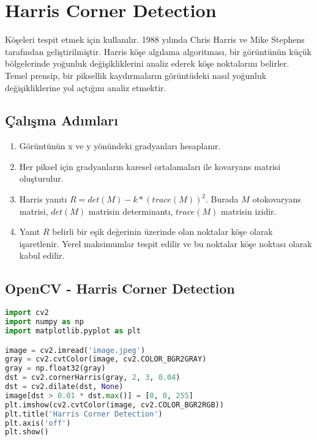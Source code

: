 \section{Harris Corner Detection}

Köşeleri tespit etmek için kullanılır. 1988 yılında Chris Harris ve Mike Stephens tarafından geliştirilmiştir. Harris köşe algılama algoritması, bir görüntünün küçük bölgelerinde yoğunluk değişikliklerini analiz ederek köşe noktalarını belirler. Temel prensip, bir piksellik kaydırmaların görüntüdeki nasıl yoğunluk değişikliklerine yol açtığını analiz etmektir.

\subsection{Çalışma Adımları}
\begin{enumerate}
	\item Görüntünün x ve y yönündeki gradyanları hesaplanır.
	\item Her piksel için gradyanların karesel ortalamaları ile kovaryans matrisi oluşturulur. 
	\item Harris yanıtı $R = det(M) - k * (trace(M)) ^ 2$. Burada $M$ otokovaryans matrisi, $det(M)$ matrisin determinantı, $trace(M)$ matrisin izidir.
	\item Yanıt $R$ belirli bir eşik değerinin üzerinde olan noktalar köşe olarak işaretlenir. Yerel maksimumlar tespit edilir ve bu noktalar köşe noktası olarak kabul edilir.
\end{enumerate}

\subsection{OpenCV - Harris Corner Detection}
\begin{lstlisting}[language=Python]
import cv2
import numpy as np
import matplotlib.pyplot as plt

image = cv2.imread('image.jpeg')
gray = cv2.cvtColor(image, cv2.COLOR_BGR2GRAY)
gray = np.float32(gray)
dst = cv2.cornerHarris(gray, 2, 3, 0.04)
dst = cv2.dilate(dst, None)
image[dst > 0.01 * dst.max()] = [0, 0, 255]
plt.imshow(cv2.cvtColor(image, cv2.COLOR_BGR2RGB))
plt.title('Harris Corner Detection')
plt.axis('off')
plt.show()
\end{lstlisting}

\newpage